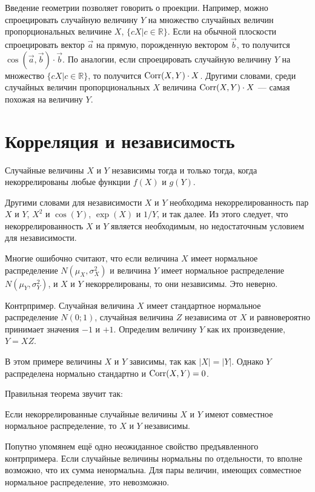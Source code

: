 \documentclass[10pt]{article}
\newcommand{\RR}{\mathbb{R}}
\begin{document}
Введение геометрии позволяет говорить о проекции. Например, можно спроецировать случайную величину $Y$ на множество случайных величин пропорциональных величине $X$, $\{cX | c\in \RR \}$. Если на обычной плоскости спроецировать вектор $\vec{a}$ на прямую, порожденную вектором $\vec{b}$, то получится $\cos(\vec{a},\vec{b})\cdot \vec{b}$. По аналогии, если спроецировать случайную величину $Y$ на множество $\{cX | c\in \RR \}$, то получится $\operatorname{Corr}(X,Y)\cdot X$. Другими словами, среди случайных величин пропорциональных $X$ величина  $\operatorname{Corr}(X,Y)\cdot X$ --- самая похожая на величину $Y$.



\section{Корреляция и независимость}

\begin{theorem}
Случайные величины $X$ и $Y$ независимы тогда и только тогда, когда некоррелированы любые функции $f(X)$ и $g(Y)$.
\end{theorem}

Другими словами для независимости $X$ и $Y$ необходима некоррелированность пар $X$ и $Y$, $X^2$ и $\cos(Y)$, $\exp(X)$ и $1/Y$, и так далее. Из этого следует, что некоррелированность $X$ и $Y$ является необходимым, но недостаточным условием для независимости.

Многие ошибочно считают, что если величина $X$ имеет нормальное распределение $N(\mu_X, \sigma^2_X)$ и величина $Y$ имеет нормальное распределение $N(\mu_Y, \sigma^2_Y)$, и $X$ и $Y$ некоррелированы, то они независимы. Это неверно.

Контрпример. Случайная величина $X$ имеет стандартное нормальное распределение $N(0;1)$, случайная величина $Z$ независима от $X$ и равновероятно принимает значения $-1$ и $+1$. Определим величину $Y$ как их произведение, $Y=XZ$. 

В этом примере величины $X$ и $Y$ зависимы, так как $|X|=|Y|$. Однако $Y$ распределена нормально стандартно и $\operatorname{Corr}(X,Y)=0$.  

Правильная теорема звучит так:

\begin{theorem}
Если некоррелированные случайные величины $X$ и $Y$ имеют совместное нормальное распределение, то $X$ и $Y$ независимы.
\end{theorem}

Попутно упомянем ещё одно неожиданное свойство предъявленного контрпримера. Если случайные величины нормальны по отдельности, то вполне возможно, что их сумма ненормальна. Для пары величин, имеющих совместное нормальное распределение, это невозможно.
\end{document}
